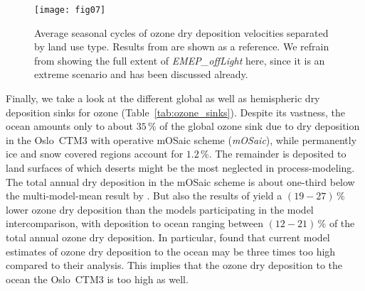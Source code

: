 \documentclass[gmd, manuscript]{copernicus}
\begin{document}
%
\begin{figure}[t]
  \texttt{[image: fig07]}
  \caption{Average seasonal cycles of ozone dry deposition velocities separated by land use type. Results from \citep{ACP:Hardacre2015} are shown as a reference. We refrain from showing the full extent of \emph{EMEP\_offLight} here, since it is an extreme scenario and has been discussed already.}
  \label{fig:mmm_drydep_season_pft}
\end{figure}
%

Finally, we take a look at the different global as well as hemispheric dry deposition sinks for ozone (Table~\ref{tab:ozone_sinks}). Despite its vastness, the ocean amounts only to about $35\,\unit{\%}$ of the global ozone sink due to dry deposition in the Oslo~CTM3 with operative mOSaic scheme (\emph{mOSaic}), while permanently ice and snow covered regions account for $1.2\,\unit{\%}$. The remainder is deposited to land surfaces of which deserts might be the most neglected in process-modeling. The total annual dry deposition in the mOSaic scheme is about one-third below the multi-model-mean result by \citet{ACP:Hardacre2015}. But also the results of \citet{ACP:Luhar2017, ACP:Luhar2018} yield a $(19-27)\,\unit{\%}$ lower ozone dry deposition than the models participating in the model intercomparison, with deposition to ocean ranging between $(12-21)\,\unit{\%}$ of the total annual ozone dry deposition. In particular, \citet{ACP:Luhar2018} found that current model estimates of ozone dry deposition to the ocean may be three times too high compared to their analysis. This implies that the ozone dry deposition to the ocean the Oslo~CTM3 is too high as well.
%
\end{document}
